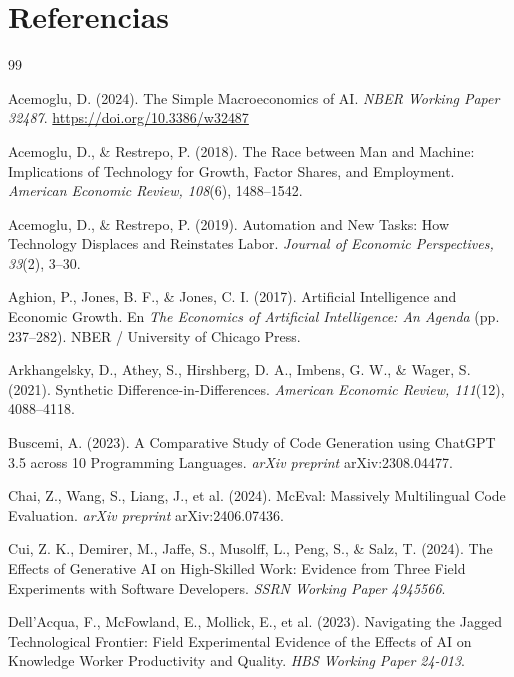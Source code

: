 \documentclass[11pt,a4paper]{article}
\theoremstyle{definition}
\begin{document}
\section*{Referencias}
\begin{singlespace}
\begin{thebibliography}{99}
\setlength{\itemsep}{0.7em}

Acemoglu, D. (2024). The Simple Macroeconomics of AI. \textit{NBER Working Paper 32487}. \url{https://doi.org/10.3386/w32487}

Acemoglu, D., \& Restrepo, P. (2018). The Race between Man and Machine: Implications of Technology for Growth, Factor Shares, and Employment. \textit{American Economic Review, 108}(6), 1488--1542.

Acemoglu, D., \& Restrepo, P. (2019). Automation and New Tasks: How Technology Displaces and Reinstates Labor. \textit{Journal of Economic Perspectives, 33}(2), 3--30.

Aghion, P., Jones, B. F., \& Jones, C. I. (2017). Artificial Intelligence and Economic Growth. En \textit{The Economics of Artificial Intelligence: An Agenda} (pp. 237--282). NBER / University of Chicago Press.

Arkhangelsky, D., Athey, S., Hirshberg, D. A., Imbens, G. W., \& Wager, S. (2021). Synthetic Difference-in-Differences. \textit{American Economic Review, 111}(12), 4088--4118.

Buscemi, A. (2023). A Comparative Study of Code Generation using ChatGPT 3.5 across 10 Programming Languages. \textit{arXiv preprint} arXiv:2308.04477.

Chai, Z., Wang, S., Liang, J., et al. (2024). McEval: Massively Multilingual Code Evaluation. \textit{arXiv preprint} arXiv:2406.07436.

Cui, Z. K., Demirer, M., Jaffe, S., Musolff, L., Peng, S., \& Salz, T. (2024). The Effects of Generative AI on High-Skilled Work: Evidence from Three Field Experiments with Software Developers. \textit{SSRN Working Paper 4945566}.

Dell'Acqua, F., McFowland, E., Mollick, E., et al. (2023). Navigating the Jagged Technological Frontier: Field Experimental Evidence of the Effects of AI on Knowledge Worker Productivity and Quality. \textit{HBS Working Paper 24-013}.


\end{thebibliography}
\end{singlespace}
\end{document}
